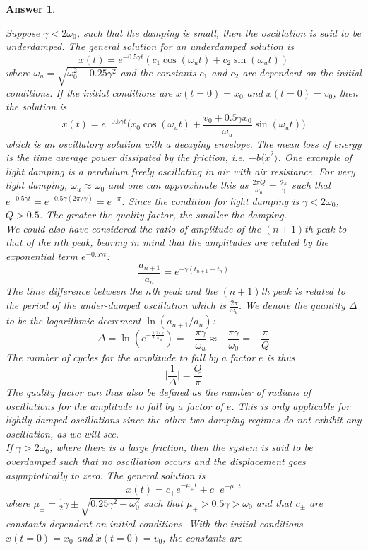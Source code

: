 \documentclass[a4paper]{article}
\newtheorem{ans}{Answer}[subsection]
\theoremstyle{new}
\begin{document}
\begin{ans}
\begin{center}
\end{center}
Suppose $\gamma<2\omega_0$, such that the damping is small, then the oscillation is said to be underdamped. The general solution for an underdamped solution is
$$x(t)=e^{-0.5\gamma t}(c_1\cos(\omega_ut)+c_2\sin(\omega_ut))$$
where $\omega_u=\sqrt{\omega_0^2-0.25\gamma^2}$ and the constants $c_1$ and $c_2$ are dependent on the initial conditions. If the initial conditions are $x(t=0)=x_0$ and $\dot{x}(t=0)=v_0$, then the solution is
$$x(t)=e^{-0.5\gamma t}\bigg(x_0\cos(\omega_ut)+\frac{v_0+0.5\gamma x_0}{\omega_u}\sin(\omega_ut)\bigg)$$
which is an oscillatory solution with a decaying envelope. The mean loss of energy is the time average power dissipated by the friction, i.e. $-b\langle\dot{x}^2\rangle$. One example of light damping is a pendulum freely oscillating in air with air resistance. For very light damping, $\omega_u\approx\omega_0$ and one can approximate this as $\frac{2\pi Q}{\omega_0}=\frac{2\pi}{\gamma}$ such that $e^{-0.5\gamma t}=e^{-0.5\gamma(2\pi/\gamma)}=e^{-\pi}$. Since the condition for light damping is $\gamma<2\omega_0$, $Q>0.5$. The greater the quality factor, the smaller the damping.\\[5pt]
We could also have considered the ratio of amplitude of the $(n+1)$th peak to that of the $n$th peak, bearing in mind that the amplitudes are related by the exponential term $e^{-0.5\gamma t}$:
$$\frac{a_{n+1}}{a_n}=e^{-\gamma(t_{n+1}-t_n)}$$
The time difference between the $n$th peak and the $(n+1)$th peak is related to the period of the under-damped oscillation which is $\frac{2\pi}{\omega_u}$. We denote the quantity $\Delta$ to be the logarithmic decrement $\ln(a_{n+1}/a_n)$:
$$\Delta=\ln(e^{-\frac{1}{2}\frac{2\pi\gamma}{\omega_u}})=-\frac{\pi\gamma}{\omega_u}\approx-\frac{\pi\gamma}{\omega_0}=-\frac{\pi}{Q}$$
The number of cycles for the amplitude to fall by a factor $e$ is thus
$$\bigg|\frac{1}{\Delta}\bigg|=\frac{Q}{\pi}$$
The quality factor can thus also be defined as the number of radians of oscillations for the amplitude to fall by a factor of $e$. This is only applicable for lightly damped oscillations since the other two damping regimes do not exhibit any oscillation, as we will see.\\[5pt]
If $\gamma>2\omega_0$, where there is a large friction, then the system is said to be overdamped such that no oscillation occurs and the displacement goes asymptotically to zero. The general solution is
$$x(t)=c_+e^{-\mu_+t}+c_-e^{-\mu_-t}$$
where $\mu_{\pm}=\frac{1}{2}\gamma\pm\sqrt{0.25\gamma^2-\omega_0^2}$ such that $\mu_+>0.5\gamma>\omega_0$ and that $c_{\pm}$ are constants dependent on initial conditions. With the initial conditions $x(t=0)=x_0$ and $\dot{x}(t=0)=v_0$, the constants are

\end{ans}
\end{document}
